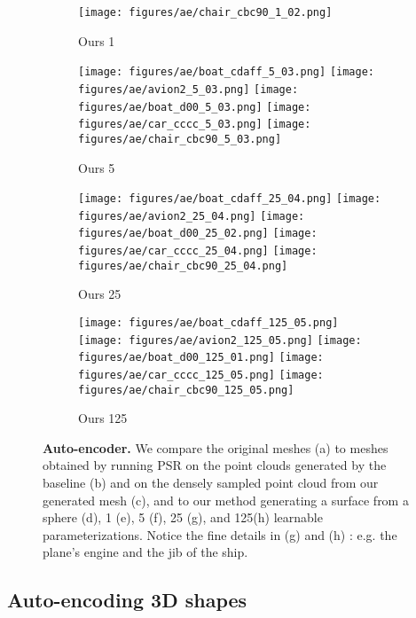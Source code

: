 \documentclass[10pt,twocolumn,letterpaper]{article}
\begin{document}
\begin{figure*}[t!]
\begin{subfigure}[b]{0.12\linewidth}
 \texttt{[image: figures/ae/chair\_cbc90\_1\_02.png]}
\caption{Ours 1}
\end{subfigure}
\begin{subfigure}[b]{0.12\linewidth}
\centering
 \texttt{[image: figures/ae/boat\_cdaff\_5\_03.png]}
 \texttt{[image: figures/ae/avion2\_5\_03.png]}
\texttt{[image: figures/ae/boat\_d00\_5\_03.png]}
 \texttt{[image: figures/ae/car\_cccc\_5\_03.png]}
 \texttt{[image: figures/ae/chair\_cbc90\_5\_03.png]}
\caption{Ours 5}
\end{subfigure}
\begin{subfigure}[b]{0.12\linewidth}
\centering
 \texttt{[image: figures/ae/boat\_cdaff\_25\_04.png]}
 \texttt{[image: figures/ae/avion2\_25\_04.png]}
\texttt{[image: figures/ae/boat\_d00\_25\_02.png]}
 \texttt{[image: figures/ae/car\_cccc\_25\_04.png]}
 \texttt{[image: figures/ae/chair\_cbc90\_25\_04.png]}
\caption{Ours 25}
\end{subfigure}
\begin{subfigure}[b]{0.12\linewidth}
\centering
 \texttt{[image: figures/ae/boat\_cdaff\_125\_05.png]}
 \texttt{[image: figures/ae/avion2\_125\_05.png]}
\texttt{[image: figures/ae/boat\_d00\_125\_01.png]}
 \texttt{[image: figures/ae/car\_cccc\_125\_05.png]}
 \texttt{[image: figures/ae/chair\_cbc90\_125\_05.png]}
\caption{Ours 125}
\end{subfigure}
\caption{
{\bf Auto-encoder.}
We compare the original meshes (a) to meshes obtained by running PSR on the point clouds generated by the baseline (b) and on the densely sampled point cloud from our generated mesh (c),  and to our method generating a surface from a sphere (d), 1 (e), 5 (f), 25 (g), and 125(h) learnable parameterizations. Notice the fine details in (g) and (h) : e.g. the plane's engine and the jib of the ship. }
  \label{fig:ae_comparison}
  \vspace{-3mm}

\end{figure*}


\subsection{Auto-encoding 3D shapes}
\label{sec:autoencoding}
\end{document}
